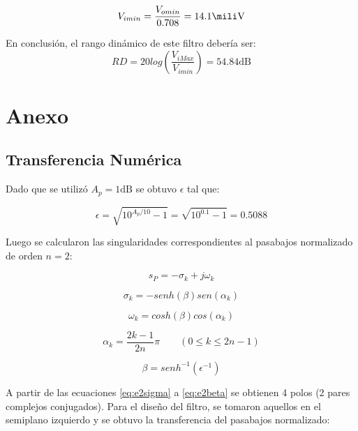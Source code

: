 {\begin{equation}
V_{i min} = \frac{V_{o min}}{0.708} = 14.1 \si{\mili\volt}
\end{equation}

En conclusión, el rango dinámico de este filtro debería ser:
\begin{equation}
RD = 20 log\left(\frac{V_{i Max}}{V_{i min}} \right)= 54.84 \si{\deci\bel}
\end{equation}

\newpage

\section{Anexo}

\subsection{Transferencia Numérica}

Dado que se utilizó $A_p=1 \si{\deci\bel}$ se obtuvo $\epsilon$ tal que:

\begin{equation}
\epsilon=\sqrt{10^{A_p/10}-1}=\sqrt{10^{0.1}-1} = 0.5088
\end{equation}

Luego se calcularon las singularidades correspondientes al pasabajos normalizado de orden $n=2$:

\begin{equation}
s_P= -\sigma _k  + j \omega _k
\label{eq:e2sing}
\end{equation}

\begin{equation}
\sigma _k=-senh( \beta ) sen(\alpha _k)
\label{eq:e2sigma}
\end{equation}

\begin{equation}
\omega _k=cosh( \beta) cos(\alpha _k)
\label{eq:e2omega}
\end{equation}

\begin{equation}
\alpha_k=\frac{2k-1}{2n}\pi \qquad (0 \leq k \leq 2n-1)
\label{eq:e2alphak}
\end{equation}

\begin{equation}
\beta=senh^{-1}\left( \epsilon^{-1}\right) 
\label{eq:e2beta}
\end{equation}

A partir de las ecuaciones \eqref{eq:e2sigma} a \eqref{eq:e2beta} se obtienen 4 polos (2 pares complejos conjugados). Para el diseño del filtro, se tomaron aquellos en el semiplano izquierdo y se obtuvo la transferencia del pasabajos normalizado:

}

